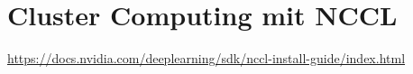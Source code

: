 	\section{Cluster Computing mit NCCL}
	\url{https://docs.nvidia.com/deeplearning/sdk/nccl-install-guide/index.html}